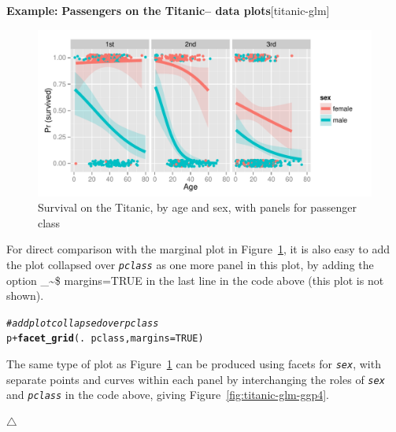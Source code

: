 \documentclass{article}
\makeatletter
\newcommand{\hlnum}[1]{\textcolor[rgb]{0.686,0.059,0.569}{#1}}%
\newcommand{\hlcom}[1]{\textcolor[rgb]{0.678,0.584,0.686}{\textit{#1}}}%
\newcommand{\hlopt}[1]{\textcolor[rgb]{0,0,0}{#1}}%
\newcommand{\hlstd}[1]{\textcolor[rgb]{0.345,0.345,0.345}{#1}}%
\newcommand{\hlkwc}[1]{\textcolor[rgb]{0.333,0.667,0.333}{#1}}%
\newcommand{\hlkwd}[1]{\textcolor[rgb]{0.737,0.353,0.396}{\textbf{#1}}}%
\newenvironment{kframe}{%
 \def\at@end@of@kframe{}%
 \ifinner\ifhmode%
  \def\at@end@of@kframe{\end{minipage}}%
  \begin{minipage}{\columnwidth}%
 \fi\fi%
 \def\FrameCommand##1{\hskip\@totalleftmargin \hskip-\fboxsep
 \colorbox{shadecolor}{##1}\hskip-\fboxsep
     \hskip-\linewidth \hskip-\@totalleftmargin \hskip\columnwidth}%
 \MakeFramed {\advance\hsize-\width
   \@totalleftmargin\z@ \linewidth\hsize
   \@setminipage}}%
 {\par\unskip\endMakeFramed%
 \at@end@of@kframe}
\newenvironment{knitrout}{}{} %
\newcommand{\figref}[1]{Figure~\ref{#1}}
\newcommand{\var}[1]{\textit{\texttt{#1}}}
\newcommand\code{\bgroup\@makeother\_\@makeother\~\@makeother\$\@codex}
\def\@codex#1{{\normalfont\ttfamily\hyphenchar\font=-1 #1}\egroup}
\newenvironment{Example}[2][unnamed-example]%
  {\medskip\noindent\textbf{\textsf{Example:}}
   \textbf{#2}\hfill [#1]\par\smallskip
  }
  {\hfill $\triangle$}
\makeatother
\begin{document}
\begin{Example}[titanic-glm]{Passengers on the Titanic-- data plots}
\begin{knitrout}
\begin{figure}[hb]
{\centering \includegraphics[width=\linewidth]{figure/titanic-glm-ggp3} 

}

\caption[Survival on the Titanic, by age and sex, with panels for passenger class]{Survival on the Titanic, by age and sex, with panels for passenger class\label{fig:titanic-glm-ggp3}}
\end{figure}


\end{knitrout}


For direct comparison with the marginal plot in
\figref{fig:titanic-glm-ggp3}, it is also easy to add the
plot collapsed over \var{pclass} as one more panel in this plot,
by adding the option \code{margins=TRUE}
in the last line in the code above (this plot is not shown).

\begin{knitrout}
\color{fgcolor}\begin{kframe}
\begin{alltt}
\hlcom{# add plot collapsed over pclass}
\hlstd{p} \hlopt{+} \hlkwd{facet_grid}\hlstd{(.} \hlopt{~} \hlstd{pclass,} \hlkwc{margins}\hlstd{=}\hlnum{TRUE}\hlstd{)}
\end{alltt}
\end{kframe}
\end{knitrout}


The same type of plot as \figref{fig:titanic-glm-ggp3}
can be produced using facets for \var{sex}, with
separate points and curves within each panel by interchanging
the roles of \var{sex} and \var{pclass} in the code above,
giving \figref{fig:titanic-glm-ggp4}.


\end{Example}
\end{document}
